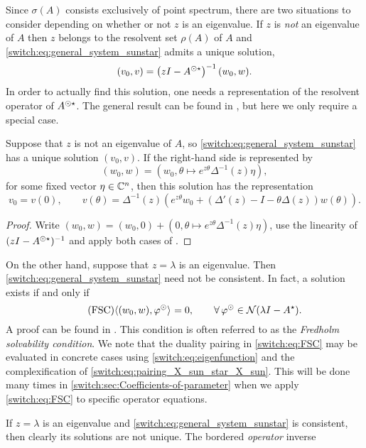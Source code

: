 Since $\sigma(A)$ consists exclusively of point spectrum, there are two situations to consider depending on whether or not $z$ is an eigenvalue. If $z$ is \emph{not} an eigenvalue of $A$ then $z$ belongs to the resolvent set $\rho(A)$ of $A$ and \cref{switch:eq:general_system_sunstar} admits a unique solution,
\[
  (v_0,v) =  \left(z I-A^{\odot\star}\right)^{-1}(w_0,w).
\]
In order to actually find this solution, one needs a representation of the resolvent operator of $A^{\odot\star}$. The general result can be found in \cite[Corollary IV.5.4]{diekmann1995delay}, but here we only require a special case.
\begin{lemma}\label{switch:lem:regular_solution}
  Suppose that $z$ is not an eigenvalue of $A$, so \cref{switch:eq:general_system_sunstar} has a unique solution $(v_0, v)$. If the right-hand side is represented by
  \[
    (w_0, w) = \left(w_0, \theta \mapsto  e^{z\theta}\Delta^{-1}(z)\eta\right),
  \]
  for some fixed vector $\eta \in \mathbb{C}^n$, then this solution has the representation
  \[
    v_0 = v(0), \qquad v(\theta) = \Delta^{-1}(z)\left(e^{z\theta}w_0  + \left(\Delta'(z) - I -\theta\Delta(z)\right)w(\theta) \right).
  \]
\end{lemma}
\begin{proof}
 Write $(w_0, w) = (w_0, 0) + (0, \theta \mapsto  e^{z\theta}\Delta^{-1}(z)\eta)$, use the linearity of $(zI - A^{\odot\star})^{-1}$ and apply both cases of \cite[Corollary 3.4]{Janssens:Thesis}.
\end{proof}
\par
On the other hand, suppose that $z = \lambda$ is an eigenvalue. Then \cref{switch:eq:general_system_sunstar} need not be consistent. In fact, a solution exists if and only if
\begin{equation}\tag{FSC}
  \label{switch:eq:FSC}
  \langle (w_0,w),\varphi^{\odot} \rangle_{} = 0, \qquad \forall\,\varphi^{\odot} \in \mathcal{N}(\lambda I - A^{\star}).
\end{equation}
A proof can be found in \cite[Lemma 3.2]{Janssens:Thesis}. This condition is often referred to as the \emph{Fredholm solvability condition}. We note that the duality pairing in \cref{switch:eq:FSC} may be evaluated in concrete cases using \cref{switch:eq:eigenfunction} and the complexification of \cref{switch:eq:pairing_X_sun_star_X_sun}. This will be done many times in \cref{switch:sec:Coefficients-of-parameter} when we apply \cref{switch:eq:FSC} to specific operator equations.
\par
If $z = \lambda$ is an eigenvalue and \cref{switch:eq:general_system_sunstar} is consistent, then clearly its solutions are not unique. The bordered \emph{operator} inverse
